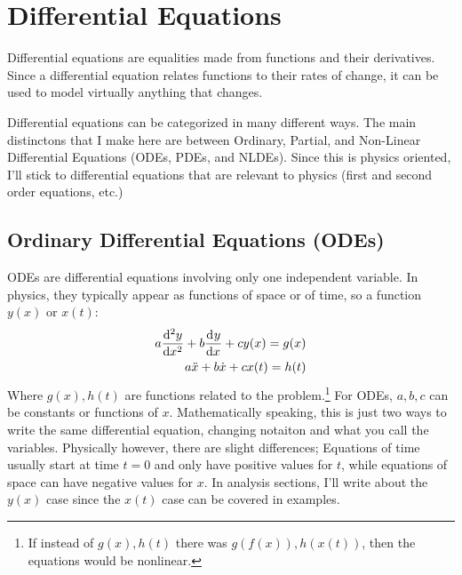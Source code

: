 \setlength{\columnseprule}{1pt}
\section{Differential Equations} 
    Differential equations are equalities made from functions and their derivatives. Since a differential equation relates  functions to their rates of change, it can be used to model virtually anything that changes. 
    \par
    Differential equations can be categorized in many different ways. The main distinctons that I make here are between Ordinary, Partial, and Non-Linear Differential Equations (ODEs, PDEs, and NLDEs). Since this is physics oriented, I'll stick to differential equations that are relevant to physics (first and second order equations, etc.)
\par
%

\subsection{Ordinary Differential Equations (ODEs)}
    ODEs are differential equations involving only one independent variable. In physics, they typically appear as functions of space or of time, so a function $y(x)$ or $x(t)$: 
    \begin{align}
        a\der[2]{y}{x}+b\der{y}{x}+cy(x)=g(x)\label{eqn:ode}
        \\
        a\Ddot{x}+b\dot{x}+cx(t)=h(t)\notag
    \end{align}
    Where $g(x),h(t)$ are functions related to the problem.\footnote{If instead of $g(x),h(t)$ there was $g(f(x)),h(x(t))$, then the equations would be nonlinear.} For ODEs, $a,b,c$ can be constants or functions of $x$. Mathematically speaking, this is just two ways to write the same differential equation, changing notaiton and what you call the variables. Physically however, there are slight differences; Equations of time usually start at time $t=0$ and only have positive values for $t$, while equations of space can have negative values for $x$. In analysis sections, I'll write about the $y(x)$ case since the $x(t)$ case can be covered in examples.
